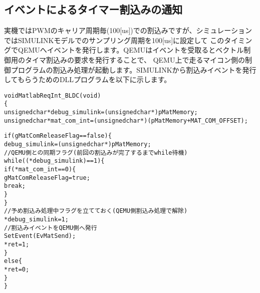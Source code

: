 \documentclass[uplatex,a4paper,twoside,10pt]{jsarticle}
\begin{document}
\subsection{イベントによるタイマー割込みの通知}
実機ではPWMのキャリア周期毎(100[us])での割込みですが、シミュレーションではSIMULINKモデルでのサンプリング周期を100[us]に設定して
このタイミングでQEMUへイベントを発行します。QEMUはイベントを受取るとベクトル制御用のタイマ割込みの要求を発行することで、
QEMU上で走るマイコン側の制御プログラムの割込み処理が起動します。SIMULINKから割込みイベントを発行してもらうためのDLLプログラムを以下に示します。
{\small
\begin{alltt}
void MatlabReqInt_BLDC(void)
\{
    unsigned char *debug_simulink = (unsigned char *)pMatMemory;
    unsigned char *mat_com_int = (unsigned char*)(pMatMemory + MAT_COM_OFFSET);

    if (gMatComReleaseFlag == false) \{
        debug_simulink = (unsigned char*)pMatMemory;
        //QEMU側との同期フラグ(前回の割込みが完了するまでwhile待機)
        while ((*debug_simulink) == 1) \{
           if (*mat_com_int == 0) \{
                gMatComReleaseFlag = true;
                break;
            \}
        \}
        //予め割込み処理中フラグを立てておく(QEMU側割込み処理で解除)
        *debug_simulink = 1;
        //割込みイベントをQEMU側へ発行
        SetEvent(EvMatSend);
        *ret = 1;
    \}
    else \{
        *ret = 0;
    \}
\}

\end{alltt}}
\end{document}
